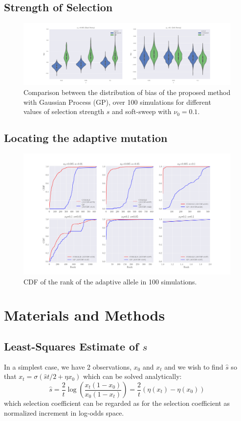 \documentclass[11pt]{article}
\begin{document}
\subsection{Strength of  Selection}
\begin{figure}
	\centering
	\includegraphics[trim=2.2in 0 2.2in 0, 
	clip,width=\textwidth]{bias}
	\caption{Comparison between the distribution of bias of the proposed method 
	with Gaussian Process (GP), over 100 simulations for different values of 
	selection strength $s$ and soft-sweep with $\nu_0=0.1$.} \label{fig:bias}
\end{figure}


\subsection{Locating the adaptive mutation}
\begin{figure}
	\centering
	\includegraphics[trim=.2in 0 .2in 0, 
	clip,width=\textwidth]{rank}
	\caption{CDF of the rank of the adaptive allele in 100 simulations.} 
	\label{fig:rank}
		\end{figure}
\section{Materials and Methods}
\newpage

\subsection{Least-Squares Estimate of $s$} \label{sec:regression}
In a simplest case, we have 2 observations, $x_0$ and $x_t$ and we wish to find 
$\hat{s}$ so that $x_t=\sigma(\hat{s}t/2+\eta{x_0})$ which can be solved 
analytically:
\begin{equation}
\hat{s}=\frac{2}{t} \log \left( \frac{x_t(1-x_0)}{x_0 (1-x_t)} \right) = 
\frac{2}{t}  \left( \eta(x_t)-\eta(x_0)\right)
\label{eq:naive2point}
\end{equation}
which selection coefficient can be regarded as for the
selection coefficient as normalized increment in log-odds space.
\end{document}
